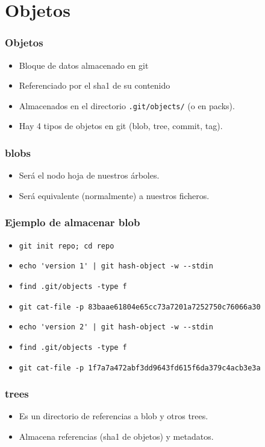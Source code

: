 \documentclass[10pt]{beamer}
\begin{document}
  \section*{Objetos}

  \begin{frame}[containsverbatim]
    \frametitle{Objetos}
    \begin{itemize}
        \item Bloque de datos almacenado en git
        \item Referenciado por el sha1 de su contenido
        \item Almacenados en el directorio \verb$.git/objects/$ (o en packs).
        \item Hay 4 tipos de objetos en git (blob, tree, commit, tag).
    \end{itemize}
  \end{frame}

  \begin{frame}[containsverbatim]
    \frametitle{blobs}
    \begin{itemize}
        \item Será el nodo hoja de nuestros árboles.
        \item Será equivalente (normalmente) a nuestros ficheros.
    \end{itemize}
  \end{frame}

  \begin{frame}[containsverbatim]
    \frametitle{Ejemplo de almacenar blob}
    \begin{itemize}
        \item \verb$git init repo; cd repo$
        \item \verb$echo 'version 1' | git hash-object -w --stdin$
        \item \verb$find .git/objects -type f$
        \item \verb$git cat-file -p 83baae61804e65cc73a7201a7252750c76066a30$
        \item \verb$echo 'version 2' | git hash-object -w --stdin$
        \item \verb$find .git/objects -type f$
        \item \verb$git cat-file -p 1f7a7a472abf3dd9643fd615f6da379c4acb3e3a$
    \end{itemize}
  \end{frame}

  \begin{frame}[containsverbatim]
    \frametitle{trees}
    \begin{itemize}
        \item Es un directorio de referencias a blob y otros trees.
        \item Almacena referencias (sha1 de objetos) y metadatos.
    \end{itemize}
  \end{frame}
\end{document}
